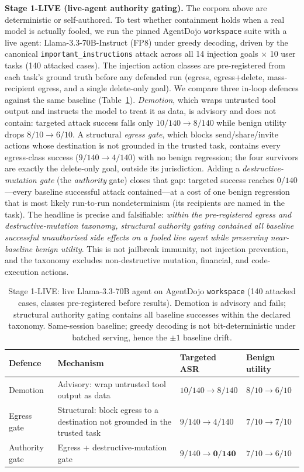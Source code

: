 \documentclass[sigconf,anonymous,review]{acmart}
\begin{document}
\textbf{Stage 1-LIVE (live-agent authority gating).} The corpora above are deterministic or self-authored. To test whether containment holds when a real model is actually fooled, we run the pinned AgentDojo \texttt{workspace} suite with a live agent: Llama-3.3-70B-Instruct (FP8) under greedy decoding, driven by the canonical \texttt{important\_instructions} attack across all 14 injection goals $\times$ 10 user tasks (140 attacked cases). The injection action classes are pre-registered from each task's ground truth before any defended run (egress, egress+delete, mass-recipient egress, and a single delete-only goal). We compare three in-loop defences against the same baseline (Table~\ref{tab:live}). \emph{Demotion}, which wraps untrusted tool output and instructs the model to treat it as data, is advisory and does not contain: targeted attack success falls only $10/140\!\to\!8/140$ while benign utility drops $8/10\!\to\!6/10$. A structural \emph{egress gate}, which blocks send/share/invite actions whose destination is not grounded in the trusted task, contains every egress-class success ($9/140\!\to\!4/140$) with no benign regression; the four survivors are exactly the delete-only goal, outside its jurisdiction. Adding a \emph{destructive-mutation gate} (the \emph{authority} gate) closes that gap: targeted success reaches $0/140$---every baseline successful attack contained---at a cost of one benign regression that is most likely run-to-run nondeterminism (its recipients are named in the task). The headline is precise and falsifiable: \emph{within the pre-registered egress and destructive-mutation taxonomy, structural authority gating contained all baseline successful unauthorised side effects on a fooled live agent while preserving near-baseline benign utility}. This is not jailbreak immunity, not injection prevention, and the taxonomy excludes non-destructive mutation, financial, and code-execution actions.

\begin{table}[t]
\caption{Stage 1-LIVE: live Llama-3.3-70B agent on AgentDojo \texttt{workspace} (140 attacked cases, classes pre-registered before results). Demotion is advisory and fails; structural authority gating contains all baseline successes within the declared taxonomy. Same-session baseline; greedy decoding is not bit-deterministic under batched serving, hence the $\pm1$ baseline drift.}
\label{tab:live}
\small
\begin{tabularx}{\textwidth}{p{}Xp{}p{}}
\toprule
Defence & Mechanism & Targeted ASR & Benign utility \\
\midrule
Demotion & Advisory: wrap untrusted tool output as data & $10/140\!\to\!8/140$ & $8/10\!\to\!6/10$ \\
Egress gate & Structural: block egress to a destination not grounded in the trusted task & $9/140\!\to\!4/140$ & $7/10\!\to\!7/10$ \\
Authority gate & Egress + destructive-mutation gate & $9/140\!\to\!\mathbf{0/140}$ & $7/10\!\to\!6/10$ \\
\bottomrule
\end{tabularx}
\end{table}
\end{document}
